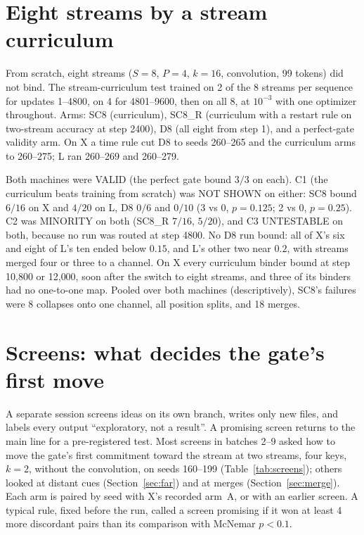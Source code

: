 \documentclass[11pt]{article}
\newcommand{\arm}[1]{\textsf{#1}}
\begin{document}
\section{Eight streams by a stream curriculum}
\label{sec:curric8}

From scratch, eight streams ($S = 8$, $P = 4$, $k = 16$, convolution, 99 tokens) did not bind. The stream-curriculum test trained on 2 of the 8 streams per sequence for updates 1--4800, on 4 for 4801--9600, then on all 8, at $10^{-3}$ with one optimizer throughout. Arms: \arm{SC8} (curriculum), \arm{SC8\_R} (curriculum with a restart rule on two-stream accuracy at step 2400), \arm{D8} (all eight from step 1), and a perfect-gate validity arm. On X a time rule cut \arm{D8} to seeds 260--265 and the curriculum arms to 260--275; L ran 260--269 and 260--279.

Both machines were VALID (the perfect gate bound $3/3$ on each). C1 (the curriculum beats training from scratch) was NOT SHOWN on either: \arm{SC8} bound $6/16$ on X and $4/20$ on L, \arm{D8} $0/6$ and $0/10$ (3 vs 0, $p = 0.125$; 2 vs 0, $p = 0.25$). C2 was MINORITY on both (\arm{SC8\_R} $7/16$, $5/20$), and C3 UNTESTABLE on both, because no run was routed at step 4800. No \arm{D8} run bound: all of X's six and eight of L's ten ended below $0.15$, and L's other two near $0.2$, with streams merged four or three to a channel. On X every curriculum binder bound at step 10{,}800 or 12{,}000, soon after the switch to eight streams, and three of its binders had no one-to-one map. Pooled over both machines (descriptively), \arm{SC8}'s failures were 8 collapses onto one channel, all position splits, and 18 merges.

\section{Screens: what decides the gate's first move}
\label{sec:screens}

A separate session screens ideas on its own branch, writes only new files, and labels every output ``exploratory, not a result''. A promising screen returns to the main line for a pre-registered test. Most screens in batches 2--9 asked how to move the gate's first commitment toward the stream at two streams, four keys, $k = 2$, without the convolution, on seeds 160--199 (Table~\ref{tab:screens}); others looked at distant cues (Section~\ref{sec:far}) and at merges (Section~\ref{sec:merge}). Each arm is paired by seed with X's recorded arm~\arm{A}, or with an earlier screen. A typical rule, fixed before the run, called a screen promising if it won at least 4 more discordant pairs than its comparison with McNemar $p < 0.1$.
\end{document}

